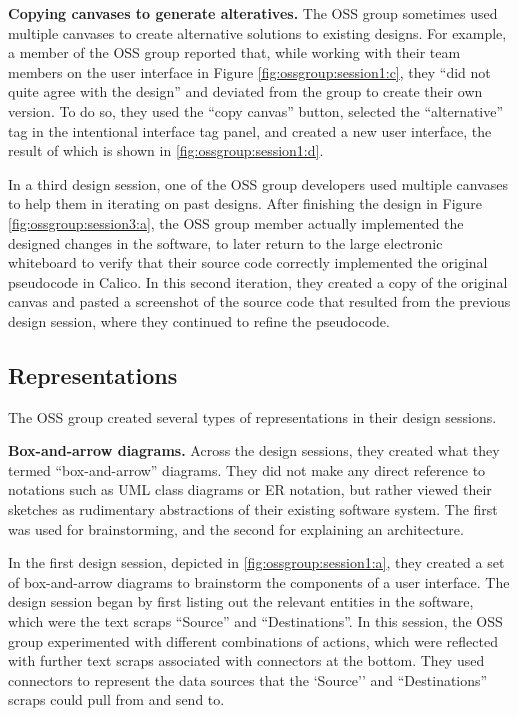 \textbf{Copying canvases to generate alteratives. } The OSS group sometimes used multiple canvases to create alternative solutions to existing designs. For example, a member of the OSS group reported that, while working with their team members on the user interface in Figure \ref{fig:ossgroup:session1:c}, they ``did not quite agree with the design'' and deviated from the group to create their own version. To do so, they used the ``copy canvas'' button, selected the ``alternative'' tag in the intentional interface tag panel, and created a new user interface, the result of which is shown in  \ref{fig:ossgroup:session1:d}. 

In a third design session, one of the OSS group developers used multiple canvases to help them in iterating on past designs. After finishing the design in Figure \ref{fig:ossgroup:session3:a}, the OSS group member actually implemented the designed changes in the software, to later return to the large electronic whiteboard to verify that their source code correctly implemented the original pseudocode in Calico. In this second iteration, they created a copy of the original canvas and pasted a screenshot of the source code that resulted from the previous design session, where they continued to refine the pseudocode.

\subsection{Representations}

The OSS group created several types of representations in their design sessions.

\textbf{Box-and-arrow diagrams. } Across the design sessions, they created what they termed ``box-and-arrow'' diagrams. They did not make any direct reference to notations such as UML class diagrams or ER notation, but rather viewed their sketches as rudimentary abstractions of their existing software system. The first was used for brainstorming, and the second for explaining an architecture.

In the first design session, depicted in \ref{fig:ossgroup:session1:a}, they created a set of box-and-arrow diagrams to brainstorm the components of a user interface. The design session began by first listing out the relevant entities in the software, which were the text scraps ``Source'' and ``Destinations''. In this session, the OSS group experimented with different combinations of actions, which were reflected with further text scraps associated with connectors at the bottom. They used connectors to represent the data sources that the `Source'' and ``Destinations'' scraps could pull from and send to.

